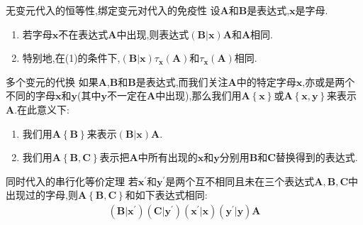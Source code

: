 \begin{metatheorem}{无变元代入的恒等性,绑定变元对代入的免疫性}{}
	设$\boldsymbol{A}$和$\boldsymbol{B}$是表达式,$\boldsymbol{x}$是字母.
	\begin{enumerate}
		\item 若字母$\boldsymbol{x}$不在表达式$\boldsymbol{A}$中出现,则表达式$\left(\boldsymbol{B}|\boldsymbol{x}\right)\boldsymbol{A}$和$\boldsymbol{A}$相同.
		\item 特别地,在(1)的条件下,$\left(\boldsymbol{B}|\boldsymbol{x}\right)\tau_{\boldsymbol{x}}\left(\boldsymbol{A}\right)$和$\tau_{\boldsymbol{x}}\left(\boldsymbol{A}\right)$相同.
	\end{enumerate}
\end{metatheorem}

\begin{definition}{多个变元的代换}{}
	如果$\boldsymbol{A}$,$\boldsymbol{B}$和$\boldsymbol{B}$是表达式,而我们关注$\boldsymbol{A}$中的特定字母$\boldsymbol{x}$,亦或是两个不同的字母$\boldsymbol{x}$和$\boldsymbol{y}$(其中$\boldsymbol{y}$不一定在$\boldsymbol{A}$中出现),那么我们用$\boldsymbol{A}\left\{\boldsymbol{x}\right\}$或$\boldsymbol{A}\left\{\boldsymbol{x},\boldsymbol{y}\right\}$来表示$\boldsymbol{A}$.在此意义下:
	\begin{enumerate}
		\item 我们用$\boldsymbol{A}\left\{\boldsymbol{B}\right\}$来表示$\left(\boldsymbol{B}|\boldsymbol{x}\right)\boldsymbol{A}$.
		\item 我们用$\boldsymbol{A}\left\{\boldsymbol{B},\boldsymbol{C}\right\}$表示把$\boldsymbol{A}$中所有出现的$\boldsymbol{x}$和$\boldsymbol{y}$分别用$\boldsymbol{B}$和$\boldsymbol{C}$替换得到的表达式.
	\end{enumerate}
\end{definition}

\begin{metatheorem}{同时代入的串行化等价定理}{}
	若$\boldsymbol{x}^{\prime}$和$\boldsymbol{y}^{\prime}$是两个互不相同且未在三个表达式$\boldsymbol{A},\boldsymbol{B},\boldsymbol{C}$中出现过的字母,则$\boldsymbol{A}\left\{\boldsymbol{B},\boldsymbol{C}\right\}$和如下表达式相同:
	\begin{align*}
		\left(\boldsymbol{B}|\boldsymbol{x}^{\prime}\right)\left(\boldsymbol{C}|\boldsymbol{y}^{\prime}\right)\left(\boldsymbol{x}^{\prime}|\boldsymbol{x}\right)\left(\boldsymbol{y}^{\prime}|\boldsymbol{y}\right)\boldsymbol{A}
	\end{align*}
\end{metatheorem}

